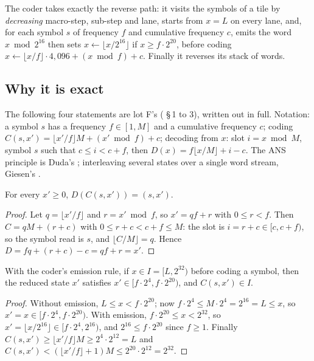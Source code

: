 The coder takes exactly the reverse path: it visits the symbols of a tile by \emph{decreasing} macro-step, sub-step and lane, starts from $x = L$ on every lane, and, for each symbol $s$ of frequency $f$ and cumulative frequency $c$, emits the word $x \bmod 2^{16}$ then sets $x \leftarrow \lfloor x / 2^{16} \rfloor$ if $x \ge f \cdot 2^{20}$, before coding $x \leftarrow \lfloor x/f \rfloor \cdot 4{,}096 + (x \bmod f) + c$. Finally it reverses its stack of words.

\subsection{Why it is exact}

The following four statements are lot F's ( §\,1 to 3), written out in full. Notation: a symbol $s$ has a frequency $f \in [1, M]$ and a cumulative frequency $c$; coding $C(s, x') = \lfloor x'/f \rfloor M + (x' \bmod f) + c$; decoding from $x$: slot $i = x \bmod M$, symbol $s$ such that $c \le i < c + f$, then $D(x) = f \lfloor x/M \rfloor + i - c$. The ANS principle is Duda's \cite{duda2013ans}; interleaving several states over a single word stream, Giesen's \cite{giesen2014interleaved}.

\begin{lemme}\label{t2fmt:lem:inverse}
For every $x' \ge 0$, $D(C(s, x')) = (s, x')$.
\end{lemme}
\begin{proof}
Let $q = \lfloor x'/f \rfloor$ and $r = x' \bmod f$, so $x' = qf + r$ with $0 \le r < f$. Then $C = qM + (r + c)$ with $0 \le r + c < c + f \le M$: the slot is $i = r + c \in [c, c + f)$, so the symbol read is $s$, and $\lfloor C/M \rfloor = q$. Hence $D = fq + (r + c) - c = qf + r = x'$.
\end{proof}

\begin{lemme}\label{t2fmt:lem:intervalle}
With the coder's emission rule, if $x \in I = [L, 2^{32})$ before coding a symbol, then the reduced state $x'$ satisfies $x' \in [f \cdot 2^4, f \cdot 2^{20})$, and $C(s, x') \in I$.
\end{lemme}
\begin{proof}
Without emission, $L \le x < f \cdot 2^{20}$; now $f \cdot 2^4 \le M \cdot 2^4 = 2^{16} = L \le x$, so $x' = x \in [f \cdot 2^4, f \cdot 2^{20})$. With emission, $f \cdot 2^{20} \le x < 2^{32}$, so $x' = \lfloor x/2^{16} \rfloor \in [f \cdot 2^4, 2^{16})$, and $2^{16} \le f \cdot 2^{20}$ since $f \ge 1$. Finally $C(s, x') \ge \lfloor x'/f \rfloor M \ge 2^4 \cdot 2^{12} = L$ and $C(s, x') < (\lfloor x'/f \rfloor + 1) M \le 2^{20} \cdot 2^{12} = 2^{32}$.
\end{proof}

